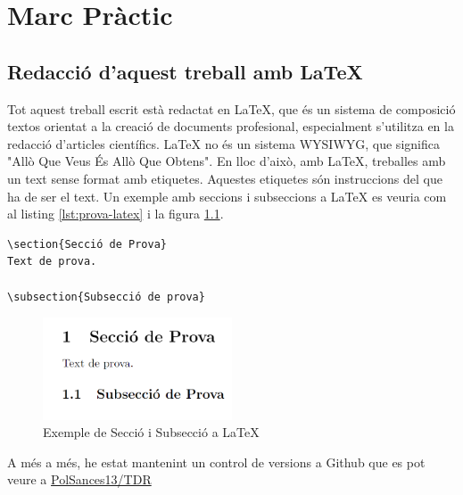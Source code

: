 \part{Marc Pràctic}

\chapter{Redacció d'aquest treball amb \LaTeX}

Tot aquest treball escrit està redactat en LaTeX, que és un sistema de composició textos orientat a la creació de documents profesional, especialment s'utilitza en la redacció d'articles científics.
LaTeX no és un sistema WYSIWYG, que significa "Allò Que Veus És Allò Que Obtens". En lloc d'això, amb LaTeX, treballes amb un text sense format amb etiquetes. Aquestes etiquetes són instruccions del que ha de ser el text.
Un exemple amb seccions i subseccions a LaTeX es veuria com al listing \ref{lst:prova-latex} i la figura \ref{fig:prova-latex}.

\begin{lstlisting}[style=latex, caption={Exemple de Secció i Subsecció a LaTeX}, label={lst:prova-latex}]
\section{Secció de Prova}
Text de prova.

\subsection{Subsecció de prova}

\end{lstlisting}

\begin{figure}[h]
    \centering
    \includegraphics[width=0.5\textwidth]{img/figures/prova-codi-latex.png}
    \caption{Exemple de Secció i Subsecció a LaTeX}
    \label{fig:prova-latex}
\end{figure}


A més a més, he estat mantenint un control de versions a Github que es pot veure a \href{https://github.com/PolSances13/TDR}{PolSances13/TDR}

